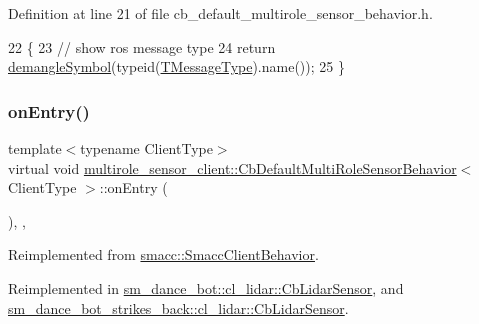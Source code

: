 Definition at line 21 of file cb\+\_\+default\+\_\+multirole\+\_\+sensor\+\_\+behavior.\+h.


\begin{DoxyCode}
22   \{
23     \textcolor{comment}{// show ros message type}
24     \textcolor{keywordflow}{return} \hyperlink{namespacesmacc_1_1introspection_a2f495108db3e57604d8d3ff5ef030302}{demangleSymbol}(\textcolor{keyword}{typeid}(\hyperlink{classmultirole__sensor__client_1_1CbDefaultMultiRoleSensorBehavior_a8343b60b6962dd8a5588d8415dd33dd9}{TMessageType}).name());
25   \}
\end{DoxyCode}
\mbox{\label{classmultirole__sensor__client_1_1CbDefaultMultiRoleSensorBehavior_aa9241e84a1002547336a8754b7dd2d26}} 
\subsubsection{\texorpdfstring{on\+Entry()}{onEntry()}}
{\footnotesize\ttfamily template$<$typename Client\+Type$>$ \\
virtual void \hyperlink{classmultirole__sensor__client_1_1CbDefaultMultiRoleSensorBehavior}{multirole\+\_\+sensor\+\_\+client\+::\+Cb\+Default\+Multi\+Role\+Sensor\+Behavior}$<$ Client\+Type $>$\+::on\+Entry (\begin{DoxyParamCaption}{ }\end{DoxyParamCaption})\hspace{0.3cm}{\ttfamily [inline]}, {\ttfamily [override]}, {\ttfamily [virtual]}}



Reimplemented from \hyperlink{classsmacc_1_1SmaccClientBehavior_a7962382f93987c720ad432fef55b123f}{smacc\+::\+Smacc\+Client\+Behavior}.



Reimplemented in \hyperlink{structsm__dance__bot_1_1cl__lidar_1_1CbLidarSensor_aad3468a6ae78999c9fd01bdb81b42a49}{sm\+\_\+dance\+\_\+bot\+::cl\+\_\+lidar\+::\+Cb\+Lidar\+Sensor}, and \hyperlink{structsm__dance__bot__strikes__back_1_1cl__lidar_1_1CbLidarSensor_a82d0250dcf2d4e9b12ccd528a5d87002}{sm\+\_\+dance\+\_\+bot\+\_\+strikes\+\_\+back\+::cl\+\_\+lidar\+::\+Cb\+Lidar\+Sensor}.



